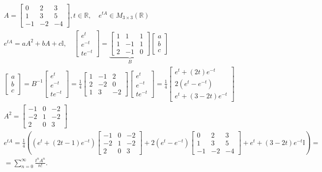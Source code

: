 \documentclass[../main.tex]{subfiles}
\begin{document}
\begin{przyklad}
\begin{align*}
    &A = \begin{bmatrix} 0&2&3\\1&3&5\\-1&-2&-4 \end{bmatrix} , t\in \mathbb{R},\quad e^{tA}\in M_{3\times 3}(\mathbb{R})\\
    &e^{tA} = aA^2 + bA + c \mathbb{I}, \quad \begin{bmatrix} e^t\\e^{-t}\\te^{-t} \end{bmatrix} = \underbrace{\begin{bmatrix} 1&1&1\\1&-1&1\\2&-1&0 \end{bmatrix}}_{B} \begin{bmatrix} a\\b\\c \end{bmatrix}\\
    &\begin{bmatrix} a\\b\\c \end{bmatrix} = B^{-1}\begin{bmatrix} e^{t}\\e^{-t}\\te^{-t} \end{bmatrix} = \frac{1}{4} \begin{bmatrix} 1&-1&2\\2&-2&0\\1&3&-2 \end{bmatrix} \begin{bmatrix} e^{t}\\e^{-t}\\te^{-t} \end{bmatrix} = \frac{1}{4} \begin{bmatrix} e^{t}+(2t)e^{-t}\\2(e^t-e^{-t})\\e^t + (3 - 2t)e^{-t} \end{bmatrix}\\
    &A^2 = \begin{bmatrix} -1&0&-2\\-2&1&-2\\2&0&3 \end{bmatrix}\\
    &e^{tA} = \frac{1}{4}\left( (e^t+(2t-1)e^{-t})\begin{bmatrix} -1&0&-2\\-2&1&-2\\2&0&3 \end{bmatrix} + 2(e^t - e^{-t})\begin{bmatrix} 0&2&3\\1&3&5\\-1&-2&-4 \end{bmatrix} + e^t + (3-2t)e^{-t} \mathbb{I} \right) =\\
    &= \sum_{n=0}^{\infty} \frac{t^nA^n}{n!}
.\end{align*}


\end{przyklad}
\end{document}
